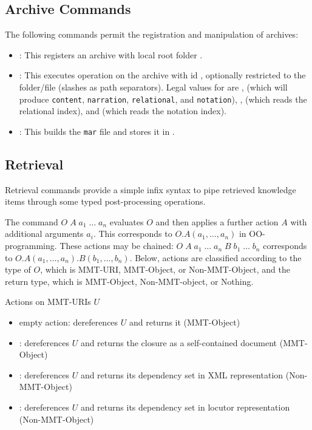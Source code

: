 \subsection{Archive Commands}\label{sec:shell:archives}
The following commands permit the registration and manipulation of archives:

\begin{itemize}
\item {}: This registers an archive with local root folder .
\item {}: This executes operation  on the archive with id , optionally restricted to the folder/file  (slashes as path separators). Legal values for  are ,  (which will produce \texttt{content}, \texttt{narration}, \texttt{relational}, and \texttt{notation}), ,  (which reads the relational index), and  (which reads the notation index).
\item {}: This builds the \texttt{mar} file and stores it in .
\end{itemize}

\subsection{Retrieval}\label{sec:shell:actions}
Retrieval commands provide a simple infix syntax to pipe retrieved knowledge items through some typed post-processing operations.

The command $O\;A\;a_1\;\ldots\;a_n$ evaluates $O$ and then applies a further action $A$ with additional arguments $a_i$. This corresponds to $O.A(a_1,\ldots,a_n)$ in OO-programming. These actions may be chained: $O\;A\;a_1\;\ldots\;a_n \;B\;b_1\;\ldots\;b_n$ corresponds to $O.A(a_1,\ldots,a_n).B(b_1,\ldots,b_n)$.
Below, actions are classified according to the type of $O$, which is MMT-URI, MMT-Object, or Non-MMT-Object, and the return type, which is MMT-Object, Non-MMT-object, or Nothing.
\smallskip

\noindent
Actions on MMT-URIs $U$
\begin{itemize}
\item empty action: dereferences $U$ and returns it (MMT-Object)
\item {}: dereferences $U$ and returns the closure as a self-contained document (MMT-Object)
\item {}: dereferences $U$ and returns its dependency set in XML representation (Non-MMT-Object)
\item {}: dereferences $U$ and returns its dependency set in locutor representation (Non-MMT-Object)
\end{itemize}

